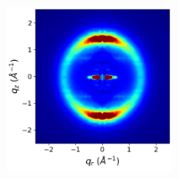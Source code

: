 \documentclass[journal=jpcbfk,manusciprt=article]{achemso}
\begin{document}
\begin{figure}[htb]
\begin{subfigure}{0.88\textwidth}
\begin{subfigure}{0.28\linewidth}
\begin{subfigure}{\textwidth}
		        	\includegraphics[width=\linewidth]{rzplot_offset_300K_jet_nocbar.png}
			\end{subfigure}
			

\end{subfigure}
\end{subfigure}
\end{figure}
\end{document}
